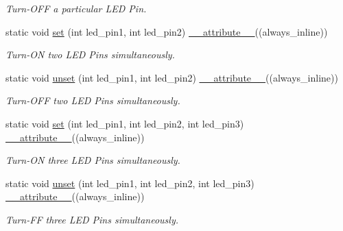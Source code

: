 \begin{DoxyCompactItemize}
\begin{DoxyCompactList}\small\item\em Turn-\/\+O\+FF a particular L\+ED Pin. \end{DoxyCompactList}\item 
static void \hyperlink{classLEDSet_abc6b67a569ff0835ac4ccc8f0615af70}{set} (int led\+\_\+pin1, int led\+\_\+pin2) \hyperlink{utilities_8hpp_a103d5b3998e0dd804213c8f30a094f4d}{\+\_\+\+\_\+attribute\+\_\+\+\_\+}((always\+\_\+inline))
\begin{DoxyCompactList}\small\item\em Turn-\/\+ON two L\+ED Pins simultaneously. \end{DoxyCompactList}\item 
static void \hyperlink{classLEDSet_abf0914e193e85bf172455fa55049bd09}{unset} (int led\+\_\+pin1, int led\+\_\+pin2) \hyperlink{utilities_8hpp_a103d5b3998e0dd804213c8f30a094f4d}{\+\_\+\+\_\+attribute\+\_\+\+\_\+}((always\+\_\+inline))
\begin{DoxyCompactList}\small\item\em Turn-\/\+O\+FF two L\+ED Pins simultaneously. \end{DoxyCompactList}\item 
static void \hyperlink{classLEDSet_a011daad7621d4b30d56d685bcff779d0}{set} (int led\+\_\+pin1, int led\+\_\+pin2, int led\+\_\+pin3) \hyperlink{utilities_8hpp_a103d5b3998e0dd804213c8f30a094f4d}{\+\_\+\+\_\+attribute\+\_\+\+\_\+}((always\+\_\+inline))
\begin{DoxyCompactList}\small\item\em Turn-\/\+ON three L\+ED Pins simultaneously. \end{DoxyCompactList}\item 
static void \hyperlink{classLEDSet_a021ebbfef0fa17171d6b4e47c32e78b5}{unset} (int led\+\_\+pin1, int led\+\_\+pin2, int led\+\_\+pin3) \hyperlink{utilities_8hpp_a103d5b3998e0dd804213c8f30a094f4d}{\+\_\+\+\_\+attribute\+\_\+\+\_\+}((always\+\_\+inline))
\begin{DoxyCompactList}\small\item\em Turn-\/\+FF three L\+ED Pins simultaneously. \end{DoxyCompactList}\end{DoxyCompactItemize}
